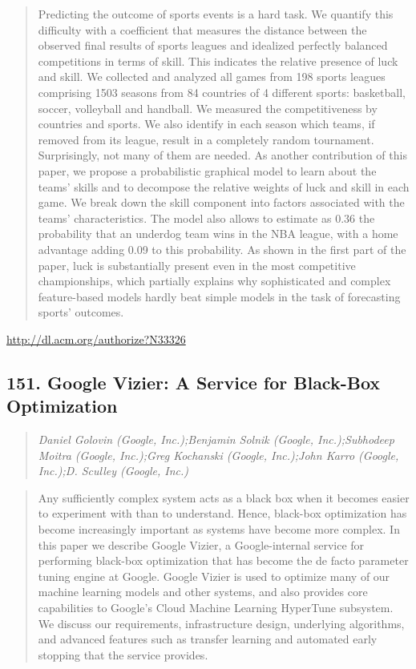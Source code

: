 \documentclass{article}
\begin{document}
\begin{quote}
Predicting the outcome of sports events is a hard task. We quantify this difficulty with a coefficient that measures the distance between the observed final results of sports leagues and idealized perfectly balanced competitions in terms of skill. This indicates the relative presence of luck and skill. We collected and analyzed all games from 198 sports leagues comprising 1503 seasons from 84 countries of 4 different sports: basketball, soccer, volleyball and handball. We measured the competitiveness by countries and sports. We also identify in each season which teams, if removed from its league, result in a completely random tournament. Surprisingly, not many of them are needed. As another contribution of this paper, we propose a probabilistic graphical model to learn about the teams’ skills and to decompose the relative weights of luck and skill in each game. We break down the skill component into factors associated with the teams’ characteristics. The model also allows to estimate as 0.36 the probability that an underdog team wins in the NBA league, with a home advantage adding 0.09 to this probability. As shown in the first part of the paper, luck is substantially present even in the most competitive championships, which partially explains why sophisticated and complex feature-based models hardly beat simple models in the task of forecasting sports’ outcomes.
\end{quote}

\href{http://dl.acm.org/authorize?N33326}{http://dl.acm.org/authorize?N33326}

\subsection{151. Google Vizier: A Service for Black-Box Optimization}

\begin{quote}
\footnotesize{\textit{Daniel Golovin (Google, Inc.);Benjamin Solnik (Google, Inc.);Subhodeep Moitra (Google, Inc.);Greg Kochanski (Google, Inc.);John Karro (Google, Inc.);D. Sculley (Google, Inc.)}}

\end{quote}

\begin{quote}
Any sufficiently complex system acts as a black box when it becomes easier to experiment with than to understand. Hence, black-box optimization has become increasingly important as systems have become more complex. In this paper we describe Google Vizier, a Google-internal service for performing black-box optimization that has become the de facto parameter tuning engine at Google. Google Vizier is used to optimize many of our machine learning models and other systems, and also provides core capabilities to Google’s Cloud Machine Learning HyperTune subsystem. We discuss our requirements, infrastructure design, underlying algorithms, and advanced features such as transfer learning and automated early stopping that the service provides.
\end{quote}
\end{document}
